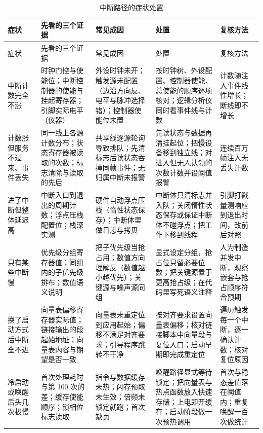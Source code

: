 \documentclass[12pt,a4paper,fontset=fandol]{ctexbook}
\begin{document}
\begin{longtable}{>{\raggedright\arraybackslash\footnotesize}p{}>{\raggedright\arraybackslash\footnotesize}p{}>{\raggedright\arraybackslash\footnotesize}p{}>{\raggedright\arraybackslash\footnotesize}p{}>{\raggedright\arraybackslash\footnotesize}p{}}
\caption{中断路径的症状处置}\label{tab:apC-isr} \\
\toprule
症状 & 先看的三个证据 & 常见成因 & 处置 & 复核方法 \\
\midrule
\endfirsthead
\toprule
症状 & 先看的三个证据 & 常见成因 & 处置 & 复核方法 \\
\midrule
\endhead
\bottomrule
\endfoot
\endlastfoot
中断计数完全不涨 & 时钟门控与使能位；中断控制器的使能与挂起寄存器；引脚实际电平（仪器） & 外设时钟未开；触发源未配置（边沿方向反、电平与脉冲选择错）；控制器使能位未置 & 按时钟树、外设配置、控制器使能、总使能的顺序逐项核对；逻辑分析仪同时看事件线与计数 & 计数随注入事件线性增长；断线即不增长 \\
计数涨但服务不过来、事件丢失 & 同一线上各源计数分布；状态寄存器被读取的次数；标志清除与读取的先后 & 共享线逐源轮询导致排队；先清标志后读状态吞掉同帧事件；无归属中断未报警 & 先读状态与数据再清挂起位；把慢设备移到独立线；对进入但无人认领的次数计数并设阈值报警 & 连续百万帧注入无丢失计数 \\
进了中断但整体延迟高 & 中断入口到退出的周期计数；浮点压栈配置位；栈深实测 & 硬件自动浮点压栈（惰性状态保存）；中断体里做日志与拷贝 & 中断体只清标志并入队；关闭惰性状态保存或保证中断体不碰浮点；把工作下移到线程 & 引脚打戳量测响应到退出时间，改前后对照 \\
只有某些中断慢 & 优先级分组寄存器值；同组内的子优先级排布；数值语义说明 & 把子优先级当抢占用；数值方向理解反（数值越小越优先）；关键源与噪声源同组 & 显式设定分组，抢占位只留必要位数；把关键源置于更高抢占级；在代码里写死语义注释 & 人为制造并发中断，观察嵌套与抢占顺序符合预期 \\
换了启动方式后中断全不进 & 向量表偏移寄存器实际值；链接输出的段起始地址；向量表内容与期望是否一致 & 向量表未重定位到应用起始；偏移不满足对齐要求；引导程序跳转不干净 & 按对齐要求设置向量表偏移；核对链接脚本中向量段与复位入口；启动早期即完成重定位 & 遍历触发每一个中断，逐一确认计数；核对复位原因 \\
冷启动或唤醒后头几次极慢 & 首次处理耗时与第 100 次的差；缓存使能顺序；锁相位标志读取 & 指令与数据缓存未热；闪存预取未生效；倍频未锁定就跑；首次缺页 & 唤醒路径显式等待锁定；把向量表与热点函数放入快速存储；上电即开缓存；启动阶段做一次预热调用 & 首次与稳态差值落在阈值内；重复唤醒一百次做统计 \\
\end{longtable}
\end{document}
